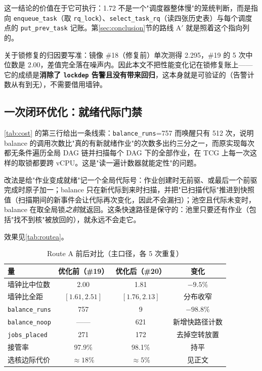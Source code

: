 这一结论的价值在于它可执行：1.72 不是一个"调度器整体慢"的笼统判断，而是指向 \texttt{enqueue\_task}（取 \texttt{rq\_lock}）、\texttt{select\_task\_rq}（读四张历史表）与每个调度点的 \texttt{put\_prev\_task} 记账。第\ref{sec:conclusion}节的路线 A$'$ 就是照着这个指向列的。

关于锁修复的归因要写准：镜像 \#18（修复前）单次测得 2.295，\#19 的 5 次中位数是 2.00，差值完全落在噪声内。因此本文不把性能变化记在锁修复账上——它的成绩是\textbf{消除了 \texttt{lockdep} 告警且没有带来回归}，这本身就是可验证的（告警计数从有到无），不需要借用墙钟。

\subsection{一次闭环优化：就绪代际门禁}

\autoref{tab:cost} 的第三行给出一条线索：\texttt{balance\_runs}=757 而唤醒只有 512 次，说明 balance 的调用次数比"真的有新就绪作业"的次数多出约三分之一，而原实现每次都无条件遍历全局 DAG 链并扫描每个 DAG 下的全部作业，在 TCG 上每一次这样的取锁都要跨 vCPU。这是"读一遍计数器就能定性"的问题。

改法是给"作业变成就绪"记一个全局代际号：作业创建时无前驱、或最后一个前驱完成时原子加一；balance 只在新代际到来时扫描，并把"已扫描代际"推进到快照值（扫描期间的新事件会让代际再次变化，因此不会漏扫）；池空且代际未变时，balance 在取全局锁\emph{之前}就返回。这条快速路径是保守的：池里只要还有作业（包括"找不到核"被放回的），就永远不会走它。

效果见\autoref{tab:routea}。

\begin{table}[H]
\centering
\caption{Route A 前后对比（主口径，各 5 次重复）}
\label{tab:routea}
\small
\begin{tabular}{@{}lccc@{}}
\toprule
量 & 优化前（\#19） & 优化后（\#20） & 变化 \\
\midrule
墙钟比中位数 & 2.00 & 1.81 & $-9.5\%$ \\
墙钟比全距 & $[1.61,2.51]$ & $[1.76,2.13]$ & 分布收窄 \\
\texttt{balance\_runs} & 757 & 9 & $-98.8\%$ \\
\texttt{balance\_noop} & —— & 621 & 新增快路径计数 \\
\texttt{jobs\_placed} & 271 & 172 & 去掉空转放置 \\
接管率 & 97.9\% & 98.1\% & 持平 \\
选核边际代价 & $\approx18\%$ & $\approx5\%$ & 见正文 \\
\bottomrule
\end{tabular}
\end{table}


